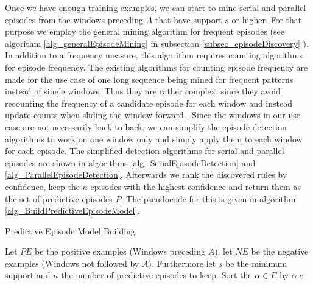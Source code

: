 Once we have enough training examples, we can start to mine serial and parallel episodes from the windows preceding $A$ that have support $s$ or higher. For that purpose we employ the general mining algorithm for frequent episodes (see algorithm \ref{alg_generalEpisodeMining} in subsection \ref{subsec_episodeDiscovery} ). In addition to a frequency measure, this algorithm requires counting algorithms for episode frequency. The existing algorithms for counting episode frequency are made for the use case of one long sequence being mined for frequent patterns instead of single windows. Thus they are rather complex, since they avoid recounting the frequency of a candidate episode for each window and instead update counts when sliding the window forward \cite{mannila1997discovery}. Since the windows in our use case are not necessarily back to back, we can simplify the episode detection algorithms to work on one window only and simply apply them to each window for each episode. The simplified detection algorithms for serial and parallel episodes are shown in algorithms \ref{alg_SerialEpisodeDetection} and \ref{alg_ParallelEpisodeDetection}. Afterwards we rank the discovered rules by confidence, keep the $n$ episodes with the highest confidence and return them as the set of predictive episodes $P$. The pseudocode for this is given in algorithm \ref{alg_BuildPredictiveEpisodeModel}.

\begin{algorithm}[H]
  \caption{Predictive Episode Model Building
    \label{alg_BuildPredictiveEpisodeModel}}
  \begin{algorithmic}[1]
    \Statex
    \Require Let $PE$ be the positive examples (Windows preceding $A$), let $NE$ be the negative examples (Windows not followed by $A$). Furthermore let $s$ be the minimum support and $n$ the number of predictive episodes to keep.
      \EndFor
      \State Sort the $\alpha \in E$ by  $\alpha .c$
      \State {}
    \EndFunction
  \end{algorithmic}
\end{algorithm}

